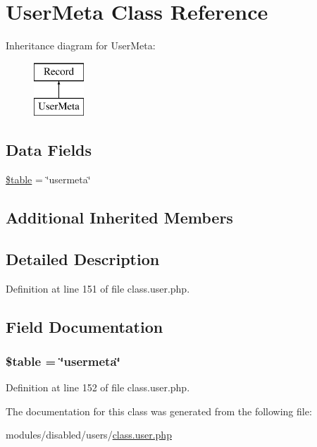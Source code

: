 \hypertarget{class_user_meta}{\section{User\-Meta Class Reference}
\label{class_user_meta}
}
Inheritance diagram for User\-Meta\-:\begin{figure}[H]
\begin{center}
\leavevmode
\includegraphics[height=2.000000cm]{class_user_meta}
\end{center}
\end{figure}
\subsection*{Data Fields}
\begin{DoxyCompactItemize}
\item 
\hyperlink{class_user_meta_ae8876a14058f368335baccf35af4a22b}{\$table} = \char`\"{}usermeta\char`\"{}
\end{DoxyCompactItemize}
\subsection*{Additional Inherited Members}


\subsection{Detailed Description}


Definition at line 151 of file class.\-user.\-php.



\subsection{Field Documentation}
\hypertarget{class_user_meta_ae8876a14058f368335baccf35af4a22b}{
\subsubsection[{\$table}]{\setlength{\rightskip}{0pt plus 5cm}\$table = \char`\"{}usermeta\char`\"{}}}\label{class_user_meta_ae8876a14058f368335baccf35af4a22b}


Definition at line 152 of file class.\-user.\-php.



The documentation for this class was generated from the following file\-:\begin{DoxyCompactItemize}
\item 
modules/disabled/users/\hyperlink{class_8user_8php}{class.\-user.\-php}\end{DoxyCompactItemize}
